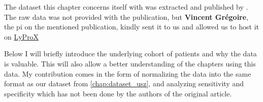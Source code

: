\begin{tcolorbox}[title=\faIcon{users} Contributions, parbox=false]
    The dataset this chapter concerns itself with was extracted and published by . The raw data was not provided with the publication, but  \textbf{Vincent Grégoire}, the \gls{pi} on the mentioned publication, kindly sent it to us and allowed us to host it on \href{https://lyprox.org}{ LyProX}

    Below I will briefly introduce the underlying cohort of patients and why the data is valuable. This will also allow a better understanding of the chapters using this data. My contribution comes in the form of normalizing the data into the same format as our dataset from \cref{chap:dataset_usz}, and analyzing sensitivity and specificity which has not been done by the authors of the original article.
\end{tcolorbox}

